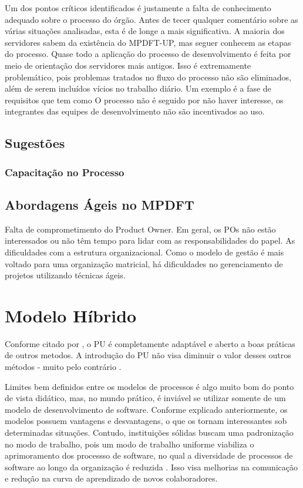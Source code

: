 \documentclass[
	article,			%
	11pt,				%
	oneside,			%
	a4paper,			%
	english,			%
	brazil,				%
	sumario=tradicional
	]{abntex2}
\begin{document}
Um dos pontos críticos identificados é justamente a falta de conhecimento
adequado sobre o processo do órgão. Antes de tecer qualquer comentário sobre as
várias situações analisadas, esta é de longe a mais significativa. A maioria dos
servidores sabem da existência do MPDFT-UP, mas seguer conhecem as etapas do
processo. Quase todo a aplicação do processo de desenvolvimento é feita por meio
de orientação dos servidores mais antigos. Isso é extremamente problemático,
pois problemas tratados no fluxo do processo não são eliminados, além de serem
incluídos vícios no trabalho diário. Um exemplo é a fase de requisitos que tem
como  O processo não é seguido por não haver interesse, os integrantes das
equipes de desenvolvimento não são incentivados ao uso.

\subsection{Sugestões}

\subsubsection{Capacitação no Processo}



\subsection{Abordagens Ágeis no MPDFT}

   Falta de comprometimento do Product Owner. Em geral, os POs não estão
   interessados ou não têm tempo para lidar com as responsabilidades do papel.
   As dificuldades com a estrutura organizacional. Como o modelo de gestão é
   mais voltado para uma organização matricial, há dificuldades no
   gerenciamento de projetos utilizando técnicas ágeis.

\section{Modelo Híbrido}

Conforme citado por , o PU é completamente
adaptável e aberto a boas práticas de outros metodos. A introdução do PU não
visa diminuir o valor desses outros métodos - muito pelo contrário
\cite{larman2007utilizando}.

Limites bem definidos entre os modelos de processos é algo muito bom do ponto de
vista didático, mas, no mundo prático, é inviável se utilizar somente de um
modelo de desenvolvimento de software. Conforme explicado anteriormente, os
modelos possuem vantagens e desvantagens, o que os tornam interessantes sob
determinadas situações. Contudo, instituições sólidas buscam uma padronização no
modo de trabalho, pois um modo de trabalho uniforme viabiliza o aprimoramento
dos processso de software, no qual a diversidade de processos de software ao
longo da organização é reduzida \cite{sommerville2007}. Isso visa melhorias na
comunicação e redução na curva de aprendizado de novos colaboradores.
\end{document}

